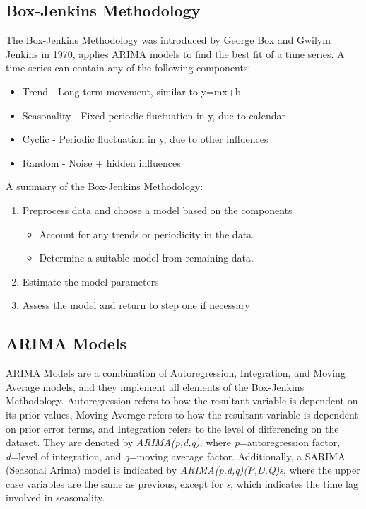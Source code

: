 \documentclass[12pt]{article}
\begin{document}
\subsection {Box-Jenkins Methodology}
  \par The Box-Jenkins Methodology was introduced by George Box and Gwilym Jenkins in 1970, applies ARIMA models to find the best fit of a time series. \cite{bj_ts}
  A time series can contain any of the following components:
  \begin{itemize}
    \item Trend - Long-term movement, similar to y=mx+b
    \item Seasonality - Fixed periodic fluctuation in y, due to calendar
    \item Cyclic - Periodic fluctuation in y, due to other influences
    \item Random - Noise + hidden influences
  \end{itemize}
  A summary of the Box-Jenkins Methodology:
  \begin{enumerate}
    \item Preprocess data and choose a model based on the components
    \begin{itemize}
      \item Account for any trends or periodicity in the data.
      \item Determine a suitable model from remaining data.
    \end{itemize}
    \item Estimate the model parameters
    \item Assess the model and return to step one if necessary
  \end{enumerate}

\subsection {ARIMA Models}
  \par ARIMA Models are a combination of Autoregression, Integration, and Moving Average models, and they implement all elements of the Box-Jenkins Methodology. Autoregression refers to how the resultant variable is dependent on its prior values, Moving Average refers to how the resultant variable is dependent on prior error terms, and Integration refers to the level of differencing on the dataset. They are denoted by \textit{ARIMA(p,d,q)}, where \textit{p}=autoregression factor, \textit{d}=level of integration, and \textit{q}=moving average factor. Additionally, a SARIMA (Seasonal Arima) model is indicated by \textit{ARIMA(p,d,q)(P,D,Q)s}, where the upper case variables are the same as previous, except for \textit{s}, which indicates the time lag involved in seasonality. \cite{arima_ts}
\end{document}
